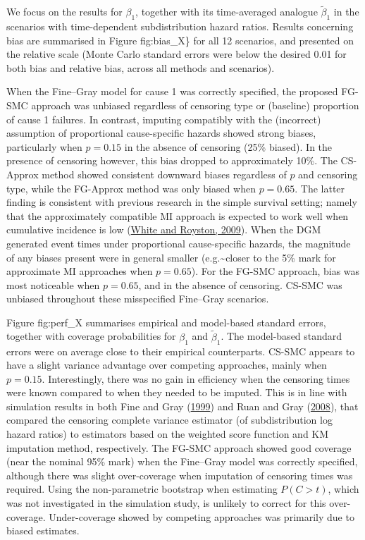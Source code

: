 \documentclass[
  letterpaper,
  DIV=11,
  numbers=noendperiod]{scrreprt}
\begin{document}
We focus on the results for \(\beta_1\), together with its time-averaged
analogue \(\tilde{\beta}_1\) in the scenarios with time-dependent
subdistribution hazard ratios. Results concerning bias are summarised in
Figure fig:bias\_X\} for all 12 scenarios, and presented on the relative
scale (Monte Carlo standard errors were below the desired 0.01 for both
bias and relative bias, across all methods and scenarios).

When the Fine--Gray model for cause 1 was correctly specified, the
proposed FG-SMC approach was unbiased regardless of censoring type or
(baseline) proportion of cause 1 failures. In contrast, imputing
compatibly with the (incorrect) assumption of proportional
cause-specific hazards showed strong biases, particularly when
\(p = 0.15\) in the absence of censoring (25\% biased). In the presence
of censoring however, this bias dropped to approximately 10\%. The
CS-Approx method showed consistent downward biases regardless of \(p\)
and censoring type, while the FG-Approx method was only biased when
\(p = 0.65\). The latter finding is consistent with previous research in
the simple survival setting; namely that the approximately compatible MI
approach is expected to work well when cumulative incidence is low
(\protect\hyperlink{ref-whiteImputingMissingCovariate2009}{White and
Royston, 2009}). When the DGM generated event times under proportional
cause-specific hazards, the magnitude of any biases present were in
general smaller (e.g.\textasciitilde closer to the 5\% mark for
approximate MI approaches when \(p = 0.65\)). For the FG-SMC approach,
bias was most noticeable when \(p = 0.65\), and in the absence of
censoring. CS-SMC was unbiased throughout these misspecified Fine--Gray
scenarios.

Figure fig:perf\_X summarises empirical and model-based standard errors,
together with coverage probabilities for \(\beta_1\) and
\(\tilde{\beta}_1\). The model-based standard errors were on average
close to their empirical counterparts. CS-SMC appears to have a slight
variance advantage over competing approaches, mainly when \(p = 0.15\).
Interestingly, there was no gain in efficiency when the censoring times
were known compared to when they needed to be imputed. This is in line
with simulation results in both Fine and Gray
(\protect\hyperlink{ref-fineProportionalHazardsModel1999}{1999}) and
Ruan and Gray
(\protect\hyperlink{ref-ruanAnalysesCumulativeIncidence2008}{2008}),
that compared the censoring complete variance estimator (of
subdistribution log hazard ratios) to estimators based on the weighted
score function and KM imputation method, respectively. The FG-SMC
approach showed good coverage (near the nominal 95\% mark) when the
Fine--Gray model was correctly specified, although there was slight
over-coverage when imputation of censoring times was required. Using the
non-parametric bootstrap when estimating \(P(C > t)\), which was not
investigated in the simulation study, is unlikely to correct for this
over-coverage. Under-coverage showed by competing approaches was
primarily due to biased estimates.
\end{document}
